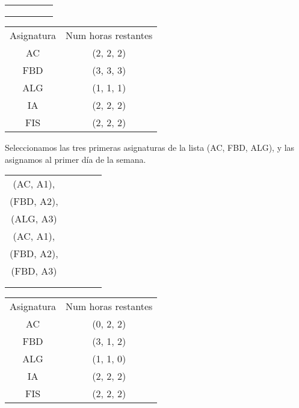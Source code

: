 \begin{minipage}{0.5\textwidth}    
\begin{tabular}{| c | c | c | c | c |}
\hline
 &  &  &  & \\
 \hline
 &  &  &  & \\
 \hline
 &  &  &  & \\
 \hline
 &  &  &  & \\
 \hline 
\end{tabular}
\end{minipage}
\begin{minipage}{0.5\textwidth}
\begin{tabular}{c | c}
Asignatura & Num horas restantes \\
AC & (2, 2, 2) \\
FBD & (3, 3, 3) \\
ALG & (1, 1, 1) \\
IA & (2, 2, 2) \\
FIS & (2, 2, 2)
\end{tabular}
\end{minipage}

Seleccionamos las tres primeras asignaturas de la lista (AC, FBD, ALG), y las asignamos al primer día de la semana.

\begin{minipage}{0.5\textwidth}    
\begin{tabular}{| c | c | c | c | c |}
\hline
 (AC, A1), &  &  &  & \\
 (FBD, A2), &  &  &  & \\
 (ALG, A3) &  &  &  & \\
 \hline
 (AC, A1), &  &  &  & \\
 (FBD, A2), &  &  &  & \\
 (FBD, A3) &  &  &  & \\
 \hline
 &  &  &  & \\
 \hline
 &  &  &  & \\
 \hline 
\end{tabular}
\end{minipage}
\begin{minipage}{0.5\textwidth}
\begin{tabular}{c | c}
Asignatura & Num horas restantes \\
AC & (0, 2, 2) \\
FBD & (3, 1, 2) \\
ALG & (1, 1, 0) \\
IA & (2, 2, 2) \\
FIS & (2, 2, 2)
\end{tabular}
\end{minipage}

